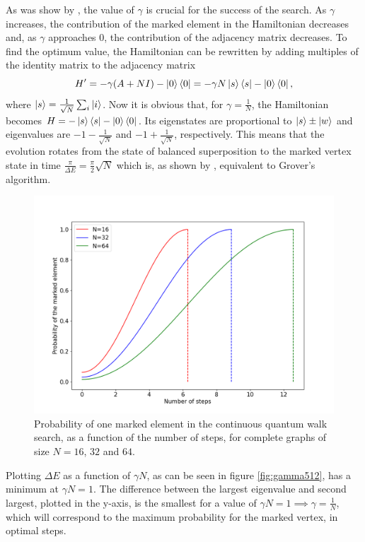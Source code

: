 \documentclass[../../dissertation.tex]{subfiles}
\begin{document}
As was show by \cite{childs2004}, the value of $\gamma$ is crucial for the
success of the search. As $\gamma$ increases, the contribution of the marked
element in the Hamiltonian decreases and, as $\gamma$ approaches $0$, the
contribution of the adjacency matrix decreases. To find the optimum value, the
Hamiltonian can be rewritten by adding multiples of the identity matrix to the
adjacency matrix 
\begin{equation}
	H' = -\gamma(A+NI) - \ket{0}\bra{0} = -\gamma N\ket{s}\bra{s} - \ket{0}\bra{0},
\end{equation}
where $\ket{s} = \frac{1}{\sqrt{N}}\sum_i \ket{i}$. Now it is obvious that, for
$\gamma = \frac{1}{N}$, the Hamiltonian becomes $H = -\ket{s}\bra{s} -
\ket{0}\bra{0}$. Its eigenstates are proportional to $\ket{s}\pm\ket{w}$ and
eigenvalues are $-1 - \frac{1}{\sqrt{N}}$ and $-1 + \frac{1}{\sqrt{N}}$,
respectively. This means that the evolution rotates from the state of balanced
superposition to the marked vertex state in time $\frac{\pi}{\Delta E} =
\frac{\pi}{2}\sqrt{N}$ which is, as shown by \cite{farhi2000}, equivalent to
Grover's algorithm.
\begin{figure}[!ht]
	\centering \includegraphics[scale=0.40]{img/ContQuantumWalk/Search/163264.png}
	\caption{Probability of one marked element in the continuous quantum walk search, as a function of the number of steps, for complete graphs of size $N=16$, $32$ and $64$.}\label{fig:ContSearchProbDist}
\end{figure}\par
Plotting $\Delta E$ as a function of $\gamma N$, as can be seen in figure
\ref{fig:gamma512}, has a minimum at $\gamma N =1$. The difference between the
largest eigenvalue and second largest, plotted in the y-axis, is the smallest
for a value of $\gamma N = 1 \implies \gamma =\frac{1}{N}$, which will
correspond to the maximum probability for the marked vertex, in optimal steps.\par
\end{document}

